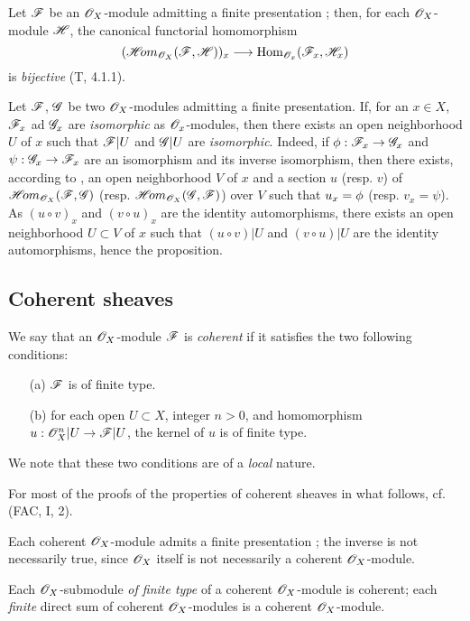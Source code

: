 \begin{env}[5.2.6]
\label{0.5.2.6}
Let $\mathscr{F}$ be an $\mathscr{O}_X$-module admitting a finite presentation ; then,
for each $\mathscr{O}_X$-module $\mathscr{H}$, the canonical functorial homomorphism
\[
  (\mathscr{H}\!{om}_{\mathscr{O}_X}(\mathscr{F},\mathscr{H}))_x\longrightarrow{\mathop{\mathrm{Hom}}\nolimits}_{\mathscr{O}_x}(\mathscr{F}_x,\mathscr{H}_x)
\]
is {\em bijective} (T, 4.1.1).
\end{env}

\begin{env}[5.2.7]
\label{0.5.2.7}
Let $\mathscr{F}$, $\mathscr{G}$ be two $\mathscr{O}_X$-modules admitting a finite presentation. If, for an
$x\in X$, $\mathscr{F}_x$ ad $\mathscr{G}_x$ are {\em isomorphic} as $\mathscr{O}_x$-modules, then there
exists an open neighborhood $U$ of $x$ such that $\mathscr{F}|U$ and $\mathscr{G}|U$ are
{\em isomorphic}. Indeed, if $\phi:\mathscr{F}_x\to\mathscr{G}_x$ and $\psi:\mathscr{G}_x\to\mathscr{F}_x$ are
an isomorphism and its inverse isomorphism, then there exists, according to
, an open neighborhood $V$ of $x$ and a section $u$ (resp. $v$) of
$\mathscr{H}\!{om}_{\mathscr{O}_X}(\mathscr{F},\mathscr{G})$ (resp. $\mathscr{H}\!{om}_{\mathscr{O}_X}(\mathscr{G},\mathscr{F})$) over $V$ such
that $u_x=\phi$ (resp. $v_x=\psi$). As $(u\circ v)_x$ and $(v\circ u)_x$ are the identity
automorphisms, there exists an open neighborhood $U\subset V$ of $x$ such that $(u\circ v)|U$
and $(v\circ u)|U$ are the identity automorphisms, hence the proposition.
\end{env}

\subsection{Coherent sheaves}
\label{subsection-coh-sheaves}

\begin{env}[5.3.1]
\label{0.5.3.1}
We say that an $\mathscr{O}_X$-module $\mathscr{F}$ is {\em coherent} if it satisfies the two following
conditions:
\begin{enumerate}
  \item[(a)] $\mathscr{F}$ is of finite type.
  \item[(b)] for each open $U\subset X$, integer $n>0$, and homomorphism $u:\mathscr{O}_X^n|U\to\mathscr{F}|U$,
    the kernel of $u$ is of finite type.
\end{enumerate}
We note that these two conditions are of a {\em local} nature.

For most of the proofs of the properties of coherent sheaves in what follows,
cf. (FAC, I, 2).
\end{env}

\begin{env}[5.3.2]
\label{0.5.3.2}
Each coherent $\mathscr{O}_X$-module admits a finite presentation ; the inverse is
not necessarily true, since $\mathscr{O}_X$ itself is not necessarily a coherent $\mathscr{O}_X$-module.

Each $\mathscr{O}_X$-submodule {\em of finite type} of a coherent $\mathscr{O}_X$-module is coherent; each
{\em finite} direct sum of coherent $\mathscr{O}_X$-modules is a coherent $\mathscr{O}_X$-module.
\end{env}

